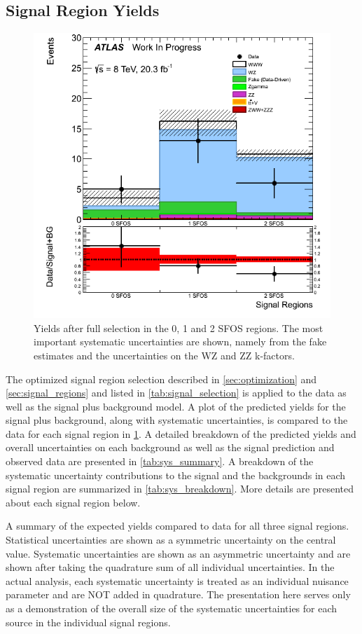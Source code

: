 \subsection{Signal Region Yields}
\label{sec:signal_yield}
\begin{figure}[ht!]
\centering
\includegraphics[width=0.5\columnwidth]{figures/SFOSSignalRegions.png}
\caption{Yields after full selection in the 0, 1 and 2 SFOS regions.  
The most important systematic uncertainties are shown, namely from the 
fake estimates and the uncertainties on the WZ and ZZ k-factors.}
\label{fig:sig_yields_nsfos}
\end{figure}

The optimized signal region selection
described in \sec\ref{sec:optimization} and \sec\ref{sec:signal_regions}
and listed in \tab\ref{tab:signal_selection} is applied 
to the data as well as the signal plus background model.
A plot of the predicted yields for the 
signal plus background, along with systematic uncertainties,
is compared to the data for each signal region
in \fig\ref{fig:sig_yields_nsfos}. A detailed 
breakdown of the predicted yields and overall uncertainties
on each background as well as the signal prediction and observed
data
are presented in \tab\ref{tab:sys_summary}.
A breakdown of the systematic uncertainty contributions
to the signal and the backgrounds in each signal region
are summarized in \tab\ref{tab:sys_breakdown}.
More details are presented about each signal region below.



\begin{table}[ht!]
\centering

\caption{A summary of the expected yields compared to data for all 
three signal regions.  Statistical uncertainties are shown 
as a symmetric uncertainty on the central value. Systematic uncertainties 
are shown as an asymmetric uncertainty and are shown
after taking the quadrature sum of all individual uncertainties. 
In the actual analysis, each systematic uncertainty is
treated as an individual nuisance parameter and are NOT added in quadrature.  
The presentation here serves only as a demonstration
of the overall size of the systematic uncertainties for each source in the 
individual signal regions.}
\label{tab:sys_summary}
\end{table}

